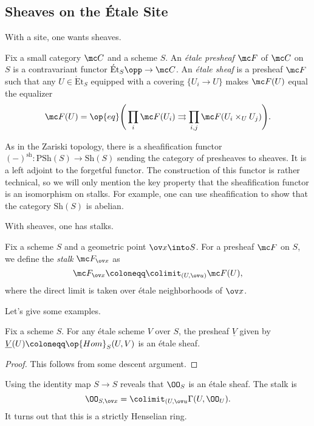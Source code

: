 \documentclass[../notes.tex]{subfiles}
\begin{document}
\subsection{Sheaves on the \'Etale Site}
With a site, one wants sheaves.
\begin{definition}[sheaf]
	Fix a small category $\mc C$ and a scheme $S$. An \textit{\'etale presheaf} $\mc F$ of $\mc C$ on $S$ is a contravariant functor $\mathrm{\acute Et}_S\opp\to\mc C$. An \textit{\'etale sheaf} is a presheaf $\mc F$ such that any $U\in\mathrm{\acute Et}_S$ equipped with a covering $\{U_i\to U\}$ makes $\mc F(U)$ equal the equalizer
	\[\mc F(U)=\op{eq}\Bigg(\prod_i\mc F(U_i)\rightrightarrows\prod_{i,j}\mc F(U_i\times_U U_j)\Bigg).\]
\end{definition}
\begin{remark}
	As in the Zariski topology, there is a sheafification functor $(-)^{\mathrm{sh}}\colon\mathrm{PSh}(S)\to\mathrm{Sh}(S)$ sending the category of presheaves to sheaves. It is a left adjoint to the forgetful functor. The construction of this functor is rather technical, so we will only mention the key property that the sheafification functor is an isomorphism on stalks. For example, one can use sheafification to show that the category $\mathrm{Sh}(S)$ is abelian.
\end{remark}
With sheaves, one has stalks.
\begin{definition}
	Fix a scheme $S$ and a geometric point $\ov x\into S$. For a presheaf $\mc F$ on $S$, we define the \textit{stalk} $\mc F_{\ov x}$ as
	\[\mc F_{\ov x}\coloneqq\colimit_{(U,\ov u)}\mc F(U),\]
	where the direct limit is taken over \'etale neighborhoods of $\ov x$.
\end{definition}
Let's give some examples.
\begin{proposition}
	Fix a scheme $S$. For any \'etale scheme $V$ over $S$, the presheaf $\underline V$ given by $\underline V(U)\coloneqq\op{Hom}_S(U,V)$ is an \'etale sheaf.
\end{proposition}
\begin{proof}
	This follows from some descent argument.
\end{proof}
\begin{example}
	Using the identity map $S\to S$ reveals that $\OO_S$ is an \'etale sheaf. The stalk is
	\[\OO_{S,\ov x}=\colimit_{(U,\ov u}\Gamma(U,\OO_U).\]
	It turns out that this is a strictly Henselian ring.
\end{example}
\end{document}
